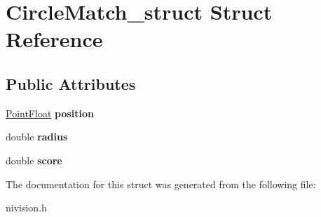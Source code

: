 \hypertarget{structCircleMatch__struct}{
\section{CircleMatch\_\-struct Struct Reference}
\label{structCircleMatch__struct}
}
\subsection*{Public Attributes}
\begin{DoxyCompactItemize}
\item 
\hypertarget{structCircleMatch__struct_a8aedec4e005e969297bde199172173f1}{
\hyperlink{structPointFloat__struct}{PointFloat} {\bfseries position}}
\label{structCircleMatch__struct_a8aedec4e005e969297bde199172173f1}

\item 
\hypertarget{structCircleMatch__struct_ab69779b888dbd1e9cb5866424cdecb83}{
double {\bfseries radius}}
\label{structCircleMatch__struct_ab69779b888dbd1e9cb5866424cdecb83}

\item 
\hypertarget{structCircleMatch__struct_af70be7888141e0d652284a1a3a327296}{
double {\bfseries score}}
\label{structCircleMatch__struct_af70be7888141e0d652284a1a3a327296}

\end{DoxyCompactItemize}


The documentation for this struct was generated from the following file:\begin{DoxyCompactItemize}
\item 
nivision.h\end{DoxyCompactItemize}

